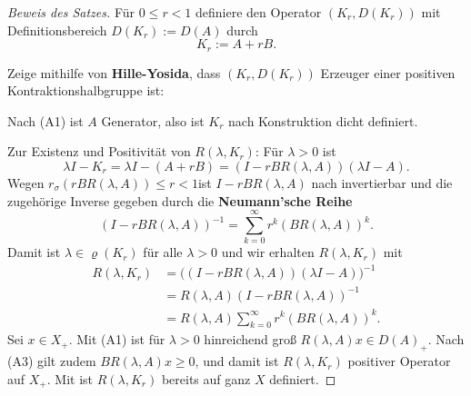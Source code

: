 \begin{proof}[Beweis des Satzes]
\par
Für $0\leq r < 1$ definiere den Operator $(K_r, D(K_r))$ mit Definitionsbereich $D(K_r):=D(A)$ durch
\begin{equation*}
K_r:= A+rB.
\end{equation*}

\par
Zeige mithilfe von \textbf{Hille-Yosida}, dass $(K_r, D(K_r))$ Erzeuger einer positiven Kontraktionshalbgruppe ist:
\par 
Nach (A1) ist $A$ Generator, also ist $K_r$ nach Konstruktion dicht definiert. 

\par 
Zur Existenz und Positivität von $R(\lambda, K_r)$: Für $\lambda>0$ ist
\begin{equation*}
\lambda I - K_r = \lambda I- (A+rB)=(I-rBR(\lambda, A))(\lambda I-A).
\end{equation*}
Wegen $r_\sigma(rBR(\lambda, A))\leq r< 1$ist $I-rBR(\lambda, A)$ nach invertierbar und die zugehörige Inverse gegeben durch die \textbf{Neumann'sche Reihe} 
\begin{equation*}
(I-rBR(\lambda, A))^{-1}=\sum_{k=0}^\infty r^k (BR(\lambda, A))^k.
\end{equation*}
Damit ist $\lambda\in\varrho(K_r)$ für alle $\lambda>0$ und wir erhalten $R(\lambda, K_r)$ mit
\begin{align*}
R(\lambda, K_r)
&=\big((I-rBR(\lambda, A))(\lambda I-A)\big)^{-1}\\
&=R(\lambda, A)(I-rBR(\lambda, A))^{-1}\\
&=R(\lambda, A)\sum_{k=0}^\infty r^k (BR(\lambda, A))^k.
\end{align*}
Sei $x\in X_+$. Mit (A1) ist für $\lambda>0$ hinreichend groß  $R(\lambda, A)x\in D(A)_+$. Nach (A3) gilt zudem $BR(\lambda,A)x\geq0$, und damit ist $R(\lambda, K_r)$ positiver Operator auf $X_+$. Mit  ist $R(\lambda, K_r)$ bereits auf ganz $X$ definiert.


\end{proof}
